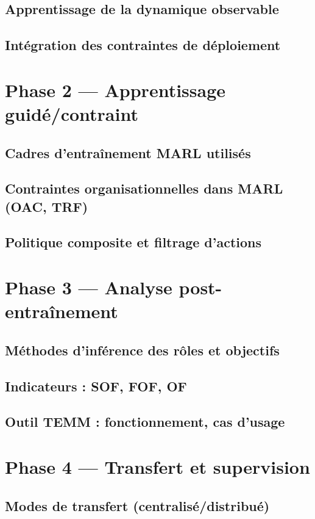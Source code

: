\documentclass[ twoside,openright,titlepage,numbers=noenddot,headinclude,%
                footinclude=true,cleardoublepage=empty,abstractoff, %
                BCOR=5mm,paper=a4,fontsize=11pt,%
                french,american,%
                ]{scrreprt}
\begin{document}
\section{Apprentissage de la dynamique observable}
\section{Intégration des contraintes de déploiement}

\chapter{Phase 2 — Apprentissage guidé/contraint}
\section{Cadres d’entraînement MARL utilisés}
\section{Contraintes organisationnelles dans MARL (OAC, TRF)}
\section{Politique composite et filtrage d’actions}

\chapter{Phase 3 — Analyse post-entraînement}
\section{Méthodes d’inférence des rôles et objectifs}
\section{Indicateurs : SOF, FOF, OF}
\section{Outil TEMM : fonctionnement, cas d’usage}

\chapter{Phase 4 — Transfert et supervision}
\section{Modes de transfert (centralisé/distribué)}
\end{document}
